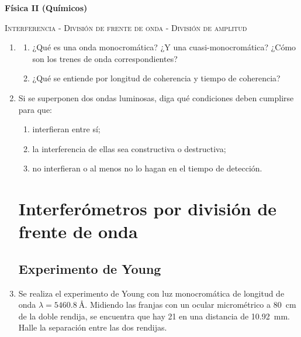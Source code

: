 \documentclass[11pt,spanish,a4paper]{article}
\begin{document}
\noindent
\textbf{Física II (Químicos)}\hfill {}
\begin{center}
  \textsc{\large Interferencia - División de frente de onda - División de amplitud}
\par\end{center}{\large \par}


\begin{enumerate}




\section*{Condiciones para la interferencia}
\item
\begin{enumerate}
	\item ¿Qué es una onda monocromática? ¿Y una cuasi-monocromática? ¿Cómo son los trenes de onda correspondientes?
	\item ¿Qué se entiende por longitud de coherencia y tiempo de coherencia?
\end{enumerate}

\item
Si se superponen dos ondas luminosas, diga qué condiciones deben cumplirse para que:
\begin{enumerate}
	\item interfieran entre sí;
	\item la interferencia de ellas sea constructiva o destructiva;
	\item no interfieran o al menos no lo hagan en el tiempo de detección.
\end{enumerate}


\section*{Interferómetros por división de frente de onda}

\subsection*{Experimento de Young}

\item 
Se realiza el experimento de Young con luz monocromática de longitud de onda \(\lambda= \SI{5460.8}{\angstrom}\).
Midiendo las franjas con un ocular micrométrico a \SI{80}{\centi\metre} de la doble rendija, se encuentra que hay \num{21} en una distancia de \SI{10.92}{\milli\metre}.
Halle la separación entre las dos rendijas.



\end{enumerate}
\end{document}
